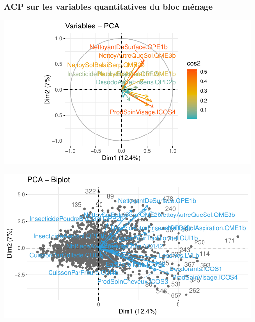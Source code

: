 \documentclass[11pt,a4paper, x11names]{article}\usepackage[]{graphicx}\usepackage[]{color}
\makeatletter
\def\maxwidth{ %
  \ifdim\Gin@nat@width>\linewidth
    \linewidth
  \else
    \Gin@nat@width
  \fi
}
\newenvironment{knitrout}{}{} %
\makeatother
\begin{document}
\subsubsection{ACP sur les variables quantitatives du bloc ménage}
\begin{minipage}{0.49\linewidth}
\begin{mdframed}
\begin{knitrout}
\color{fgcolor}
\includegraphics[width=\maxwidth]{figure/unnamed-chunk-16-1} 
\end{knitrout}
\end{mdframed}
\end{minipage}
\hfill
\begin{minipage}{0.49\linewidth}
\begin{mdframed}
\begin{knitrout}
\color{fgcolor}
\includegraphics[width=\maxwidth]{figure/unnamed-chunk-17-1} 
\end{knitrout}
\end{mdframed}
\end{minipage}
\end{document}
